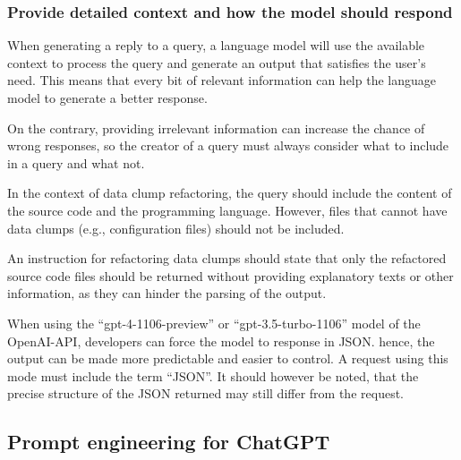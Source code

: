 \subsubsection{Provide detailed context and how the model should respond}

When generating a reply to a query, a language model will use the available context to process the query and generate an output that satisfies the user's need. This means that every bit of relevant information can help the language model to generate a better response.

On the contrary, providing irrelevant information can increase the chance of wrong responses, so the creator of a query must always consider what to include in a query and what not. 

In the context of data clump refactoring, the query should include the content of the source code and the programming language. However, files that cannot have data clumps (e.g., configuration files) should not be included.

An instruction for refactoring data clumps should state that only the refactored source code files should be returned without providing explanatory texts or other information, as they can hinder the parsing of the output. 

When using the \enquote{gpt-4-1106-preview} or \enquote{gpt-3.5-turbo-1106} model of the OpenAI-\ac{API}, developers can force the model to response in \ac{JSON}. hence, the output can be made more predictable and easier to control. A request using this mode must include the term \enquote{\ac{JSON}}. It should however be noted, that the precise structure of the \ac{JSON} returned may still differ from the request. 

\begin{comment}
\subsection{Cost reduction}

Many \ac{LLM} are not for free but must be paid based on usage or other factors. Even if a \ac{LLM} is free, there are many restrictions for the data to be processed by the model, so special care needs to be taken to reduce the data size as well as possible.  The cost might already be reduced by following the steps in section \ref{sec:prompt_engineering}. Nevertheless, there are other factors that will be outlined:
\end{comment}
\subsection{Prompt engineering for ChatGPT}

